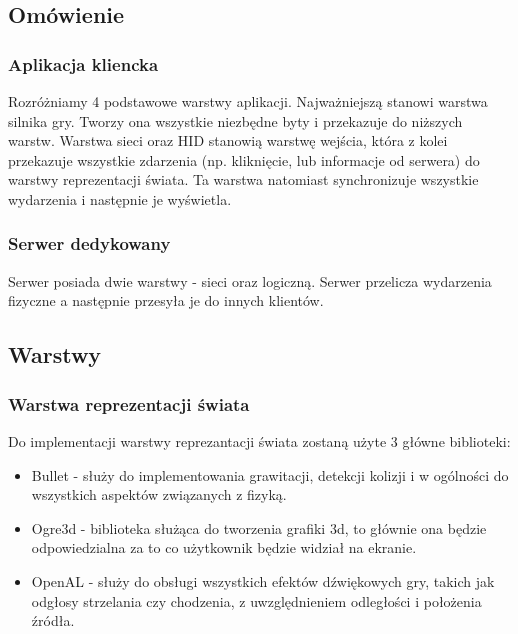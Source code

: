 \documentclass[12pt,a4paper,twoside]{article}
\begin{document}
\subsection{Omówienie}


\subsubsection{Aplikacja kliencka}

Rozróżniamy 4 podstawowe warstwy aplikacji. Najważniejszą stanowi warstwa silnika gry. Tworzy ona wszystkie niezbędne byty i przekazuje do niższych warstw. Warstwa sieci oraz HID stanowią warstwę wejścia, która z kolei przekazuje wszystkie zdarzenia (np. kliknięcie, lub informacje od serwera) do warstwy reprezentacji świata. Ta warstwa natomiast synchronizuje wszystkie wydarzenia i następnie je wyświetla.
\subsubsection{Serwer dedykowany}
Serwer posiada dwie warstwy - sieci oraz logiczną. Serwer przelicza wydarzenia fizyczne a następnie przesyła je do innych klientów.

\subsection{Warstwy}


\subsubsection{Warstwa reprezentacji świata}

Do implementacji warstwy reprezantacji świata zostaną użyte 3 główne biblioteki:

\begin{itemize}
\item Bullet - służy do implementowania grawitacji, detekcji kolizji i w ogólności do wszystkich aspektów związanych z fizyką.
\item Ogre3d - biblioteka służąca do tworzenia grafiki 3d, to głównie ona będzie odpowiedzialna za to co użytkownik będzie widział na ekranie.
\item OpenAL - służy do obsługi wszystkich efektów dźwiękowych gry, takich jak odgłosy strzelania czy chodzenia, z uwzględnieniem odległości i położenia źródła.
\end{itemize}
\end{document}
